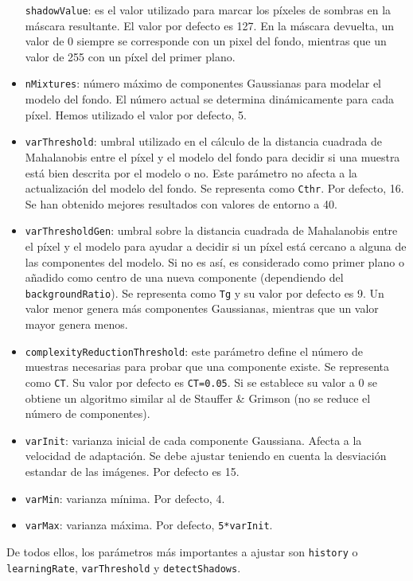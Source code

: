 \begin{itemize}
  \texttt{shadowValue}: es el valor utilizado para marcar los píxeles de
  sombras en la máscara resultante. El valor por defecto es 127. En la
  máscara devuelta, un valor de 0 siempre se corresponde con un pixel
  del fondo, mientras que un valor de 255 con un píxel del primer plano.
\item
  \texttt{nMixtures}: número máximo de componentes Gaussianas para
  modelar el modelo del fondo. El número actual se determina
  dinámicamente para cada píxel. Hemos utilizado el valor por defecto,
  5.
\item
  \texttt{varThreshold}: umbral utilizado en el cálculo de la distancia
  cuadrada de Mahalanobis entre el píxel y el modelo del fondo para
  decidir si una muestra está bien descrita por el modelo o no. Este
  parámetro no afecta a la actualización del modelo del fondo. Se
  representa como \texttt{Cthr}. Por defecto, 16. Se han obtenido
  mejores resultados con valores de entorno a 40.
\item
  \texttt{varThresholdGen}: umbral sobre la distancia cuadrada de
  Mahalanobis entre el píxel y el modelo para ayudar a decidir si un
  píxel está cercano a alguna de las componentes del modelo. Si no es
  así, es considerado como primer plano o añadido como centro de una
  nueva componente (dependiendo del \texttt{backgroundRatio}). Se
  representa como \texttt{Tg} y su valor por defecto es 9. Un valor
  menor genera más componentes Gaussianas, mientras que un valor mayor
  genera menos.
\item
  \texttt{complexityReductionThreshold}: este parámetro define el número
  de muestras necesarias para probar que una componente existe. Se
  representa como \texttt{CT}. Su valor por defecto es \texttt{CT=0.05}.
  Si se establece su valor a 0 se obtiene un algoritmo similar al de
  Stauffer \& Grimson (no se reduce el número de componentes).
\item
  \texttt{varInit}: varianza inicial de cada componente Gaussiana.
  Afecta a la velocidad de adaptación. Se debe ajustar teniendo en
  cuenta la desviación estandar de las imágenes. Por defecto es 15.
\item
  \texttt{varMin}: varianza mínima. Por defecto, 4.
\item
  \texttt{varMax}: varianza máxima. Por defecto, \texttt{5*varInit}.
\end{itemize}

De todos ellos, los parámetros más importantes a ajustar son
\texttt{history} o \texttt{learningRate}, \texttt{varThreshold} y
\texttt{detectShadows}.

